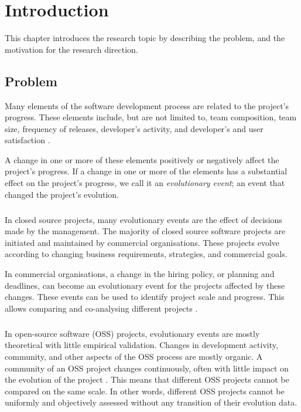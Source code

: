 \chapter{Introduction}
\label{introduction}

This chapter introduces the research topic by describing the problem, and the
motivation for the research direction.

\section{Problem}
Many elements of the software development process are related to the project's
progress. These elements include, but are not limited to, team composition,
team size, frequency of releases, developer's activity, and developer's and
user satisfaction \cite{crowston2006, delone1992, samoladas2010}.

A change in one or more of these elements positively or negatively affect the
project's progress. If a change in one or more of the elements has a substantial
effect on the project's progress, we call it an \emph{evolutionary event}\rm; an
event that changed the project's evolution.

\paragraph{}
In closed source projects, many evolutionary events are the effect of decisions
made by the management. The majority of closed source software projects are
initiated and maintained by commercial organisations. These projects evolve
according to changing business requirements, strategies, and commercial goals.

In commercial organisations, a change in the hiring policy, or planning and
deadlines, can become an evolutionary event for the projects affected by these
changes. These events can be used to identify project scale and progress. This
allows comparing and co-analysing different projects \cite{karus2013}.

\paragraph{}
In open-source software (OSS) projects, evolutionary events are mostly
theoretical with little empirical validation. Changes in development activity,
community, and other aspects of the OSS process are mostly organic. A community
of an OSS project changes continuously, often with little impact on the
evolution of the project \cite{androutsellis}. This means that different OSS
projects cannot be compared on the same scale. In other words, different OSS
projects cannot be uniformly and objectively assessed without any transition of
their evolution data.

